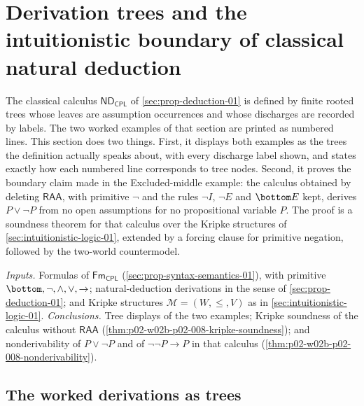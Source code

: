 \section{Derivation trees and the intuitionistic boundary of classical natural deduction}
\label{sec:p02-w02b-p02-008-trees-and-boundary}

The classical calculus \(\mathsf{ND}_{\mathsf{CPL}}\) of
\cref{sec:prop-deduction-01} is defined by finite rooted trees whose leaves
are assumption occurrences and whose discharges are recorded by labels.  The
two worked examples of that section are printed as numbered lines.  This
section does two things.  First, it displays both examples as the trees the
definition actually speaks about, with every discharge label shown, and
states exactly how each numbered line corresponds to tree nodes.  Second, it
proves the boundary claim made in the Excluded-middle example: the calculus
obtained by deleting \(\mathsf{RAA}\), with primitive \(\neg\) and the rules
\(\neg I\), \(\neg E\) and \(\bottom E\) kept, derives \(P\lor\neg P\) from no
open assumptions for no propositional variable \(P\).  The proof is a
soundness theorem for that calculus over the Kripke structures of
\cref{sec:intuitionistic-logic-01}, extended by a forcing clause for
primitive negation, followed by the two-world countermodel.

\emph{Inputs.}  Formulas of \(\mathsf{Fm}_{\mathsf{CPL}}\)
(\cref{sec:prop-syntax-semantics-01}), with primitive
\(\bottom,\neg,\land,\lor,\to\); natural-deduction derivations in the sense
of \cref{sec:prop-deduction-01}; and Kripke structures
\(\mathcal M=(W,\leq,V)\) as in \cref{sec:intuitionistic-logic-01}.
\emph{Conclusions.}  Tree displays of the two examples; Kripke soundness of
the calculus without \(\mathsf{RAA}\)
(\cref{thm:p02-w02b-p02-008-kripke-soundness}); and nonderivability of
\(P\lor\neg P\) and of \(\neg\neg P\to P\) in that calculus
(\cref{thm:p02-w02b-p02-008-nonderivability}).

\subsection{The worked derivations as trees}
\label{sec:p02-w02b-p02-008-trees}

